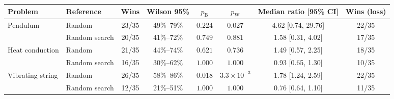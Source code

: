 \begin{tabular}{ll cc cc c c}
\toprule
Problem & Reference & Wins & Wilson 95\% & $p_{\mathrm{B}}$ & $p_{\mathrm{W}}$ & Median ratio [95\% CI] & Wins (loss) \\
\midrule
Pendulum & Random & 23/35 & 49\%--79\% & $0.224$ & $0.027$ & 4.62 [0.74, 29.76] & 22/35 \\
 & Random search & 20/35 & 41\%--72\% & $0.749$ & $0.881$ & 1.58 [0.31, 4.02] & 17/35 \\
\addlinespace
Heat conduction & Random & 21/35 & 44\%--74\% & $0.621$ & $0.736$ & 1.49 [0.57, 2.25] & 18/35 \\
 & Random search & 16/35 & 30\%--62\% & $1.000$ & $1.000$ & 0.93 [0.65, 1.30] & 10/35 \\
\addlinespace
Vibrating string & Random & 26/35 & 58\%--86\% & $0.018$ & $3.3 \times 10^{-3}$ & 1.78 [1.24, 2.59] & 22/35 \\
 & Random search & 12/35 & 21\%--51\% & $1.000$ & $1.000$ & 0.76 [0.64, 1.10] & 11/35 \\
\bottomrule
\end{tabular}
